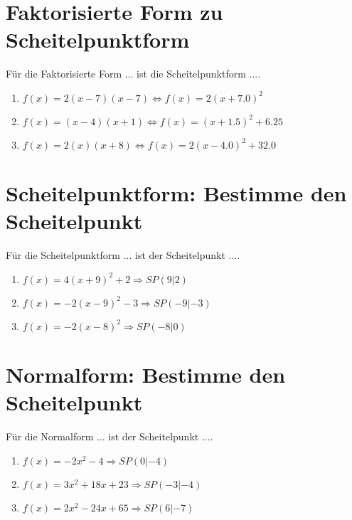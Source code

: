 \documentclass{article}%
\begin{document}
%
\section{Faktorisierte Form zu Scheitelpunktform}%
\label{sec:FaktorisierteFormzuScheitelpunktform}%
Für die Faktorisierte Form ... ist die Scheitelpunktform ....%
\begin{enumerate}[label=\alph*)]%
\item%
\newline\vspace{0.5cm}$f(x)=2(x-7)(x-7)\Leftrightarrow f(x)=2(x+7.0)^2$%
\item%
\newline\vspace{0.5cm}$f(x)=(x-4)(x+1)\Leftrightarrow f(x)=(x+1.5)^2 +6.25$%
\item%
\newline\vspace{0.5cm}$f(x)=2(x)(x+8)\Leftrightarrow f(x)=2(x-4.0)^2 +32.0$%
\end{enumerate}

%
\section{Scheitelpunktform: Bestimme den Scheitelpunkt}%
\label{sec:ScheitelpunktformBestimmedenScheitelpunkt}%
Für die Scheitelpunktform ... ist der Scheitelpunkt ....%
\begin{enumerate}[label=\alph*)]%
\item%
\newline\vspace{0.5cm}$f(x)=4(x+9)^2 +2 \Rightarrow SP(9|2) $%
\item%
\newline\vspace{0.5cm}$f(x)=-2(x-9)^2 -3 \Rightarrow SP(-9|-3) $%
\item%
\newline\vspace{0.5cm}$f(x)=-2(x-8)^2 \Rightarrow SP(-8|0) $%
\end{enumerate}

%
\section{Normalform: Bestimme den Scheitelpunkt}%
\label{sec:NormalformBestimmedenScheitelpunkt}%
Für die Normalform ... ist der Scheitelpunkt ....%
\begin{enumerate}[label=\alph*)]%
\item%
\newline\vspace{0.5cm}$f(x)=-2x^2 - 4 \Rightarrow SP(0|-4) $%
\item%
\newline\vspace{0.5cm}$f(x)=3x^2 + 18x + 23 \Rightarrow SP(-3|-4) $%
\item%
\newline\vspace{0.5cm}$f(x)=2x^2 - 24x + 65 \Rightarrow SP(6|-7) $%
\end{enumerate}
\end{document}
